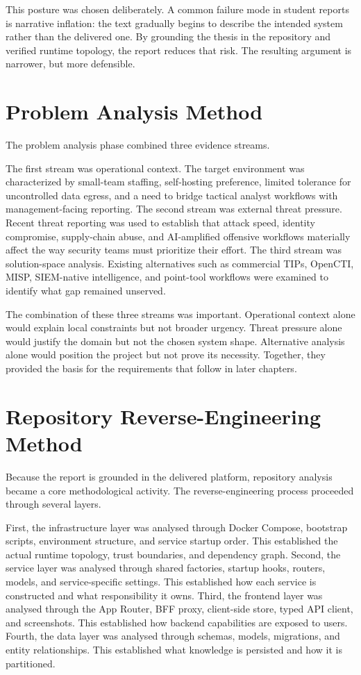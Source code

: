 This posture was chosen deliberately. A common failure mode in student reports is narrative inflation: the text gradually begins to describe the intended system rather than the delivered one. By grounding the thesis in the repository and verified runtime topology, the report reduces that risk. The resulting argument is narrower, but more defensible.

\section{Problem Analysis Method}
The problem analysis phase combined three evidence streams.

The first stream was operational context. The target environment was characterized by small-team staffing, self-hosting preference, limited tolerance for uncontrolled data egress, and a need to bridge tactical analyst workflows with management-facing reporting. The second stream was external threat pressure. Recent threat reporting was used to establish that attack speed, identity compromise, supply-chain abuse, and AI-amplified offensive workflows materially affect the way security teams must prioritize their effort. The third stream was solution-space analysis. Existing alternatives such as commercial TIPs, OpenCTI, MISP, SIEM-native intelligence, and point-tool workflows were examined to identify what gap remained unserved.

The combination of these three streams was important. Operational context alone would explain local constraints but not broader urgency. Threat pressure alone would justify the domain but not the chosen system shape. Alternative analysis alone would position the project but not prove its necessity. Together, they provided the basis for the requirements that follow in later chapters.

\section{Repository Reverse-Engineering Method}
Because the report is grounded in the delivered platform, repository analysis became a core methodological activity. The reverse-engineering process proceeded through several layers.

First, the infrastructure layer was analysed through Docker Compose, bootstrap scripts, environment structure, and service startup order. This established the actual runtime topology, trust boundaries, and dependency graph. Second, the service layer was analysed through shared factories, startup hooks, routers, models, and service-specific settings. This established how each service is constructed and what responsibility it owns. Third, the frontend layer was analysed through the App Router, BFF proxy, client-side store, typed API client, and screenshots. This established how backend capabilities are exposed to users. Fourth, the data layer was analysed through schemas, models, migrations, and entity relationships. This established what knowledge is persisted and how it is partitioned.

